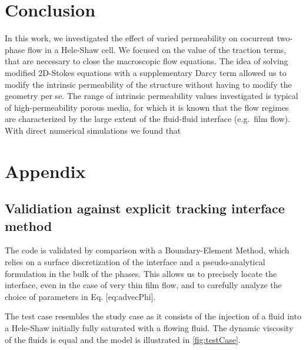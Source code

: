 \documentclass[]{article}
\begin{document}
\hypertarget{conclusion}{%
\section{Conclusion}\label{conclusion}}

In this work, we investigated the effect of varied permeability on
cocurrent two-phase flow in a Hele-Shaw cell. We focused on the value of
the traction terms, that are necessary to close the macroscopic flow
equations. The idea of solving modified 2D-Stokes equations with a
supplementary Darcy term allowed us to modify the intrinsic permeability
of the structure without having to modify the geometry per se. The range
of intrinsic permeability values investigated is typical of
high-permeability porous media, for which it is known that the flow
regimes are characterized by the large extent of the fluid-fluid
interface (e.g.~film flow). With direct numerical simulations we found
that

\hypertarget{appendix}{%
\section{Appendix}\label{appendix}}

\hypertarget{validiation-against-explicit-tracking-interface-method}{%
\subsection{Validiation against explicit tracking interface
method}\label{validiation-against-explicit-tracking-interface-method}}

The code is validated by comparison with a Boundary-Element Method,
which relies on a surface discretization of the interface and a
pseudo-analytical formulation in the bulk of the phases. This allows us
to precisely locate the interface, even in the case of very thin film
flow, and to carefully analyze the choice of parameters in Eq.
{[}eq:advecPhi{]}.

The test case resembles the study case as it consists of the injection
of a fluid into a Hele-Shaw initially fully saturated with a flowing
fluid. The dynamic viscosity of the fluids is equal and the model is
illustrated in \cref{fig:testCase}.
\end{document}
